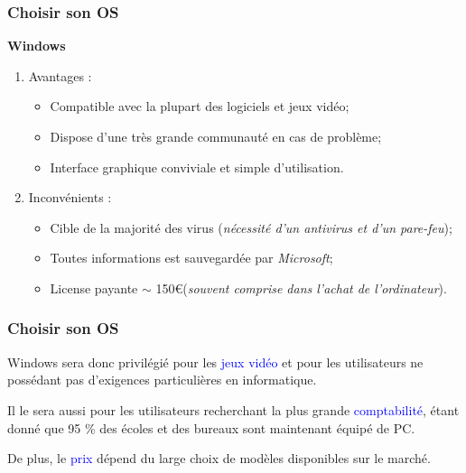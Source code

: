 \documentclass[aspectratio=169]{beamer}
\begin{document}
\begin{frame}
  \frametitle{Choisir son OS}
  \textbf{Windows}

  \hspace{0.5cm}

  \begin{enumerate}
  \item Avantages :
    \begin{itemize}
    \item Compatible avec la plupart des logiciels et jeux vidéo;

    \item Dispose d'une très grande communauté en cas de problème;

    \item Interface graphique conviviale et simple d'utilisation.
    \end{itemize}

    \hspace{0.5cm}

  \item Inconvénients :

    \begin{itemize}
    \item Cible de la majorité des virus (\textit{nécessité d'un antivirus et
      d'un pare-feu});

    \item Toutes informations est sauvegardée par \textit{Microsoft};

    \item License payante $\sim$ 150\euro \space (\textit{souvent comprise dans
      l'achat de l'ordinateur}).
    \end{itemize}
  \end{enumerate}
\end{frame}

\begin{frame}
  \frametitle{Choisir son OS}
  Windows sera donc privilégié pour les \textcolor{blue}{jeux vidéo} et pour les
  utilisateurs ne possédant pas d'exigences particulières en informatique.

  \hspace{0.5cm}

  Il le sera aussi pour les utilisateurs recherchant la plus grande
  \textcolor{blue}{comptabilité}, étant donné que 95 \% des écoles et des
  bureaux sont maintenant équipé de PC.

  \hspace{0.5cm}

  De plus, le \textcolor{blue}{prix} dépend du large choix de modèles
  disponibles sur le marché.

\end{frame}
\end{document}
